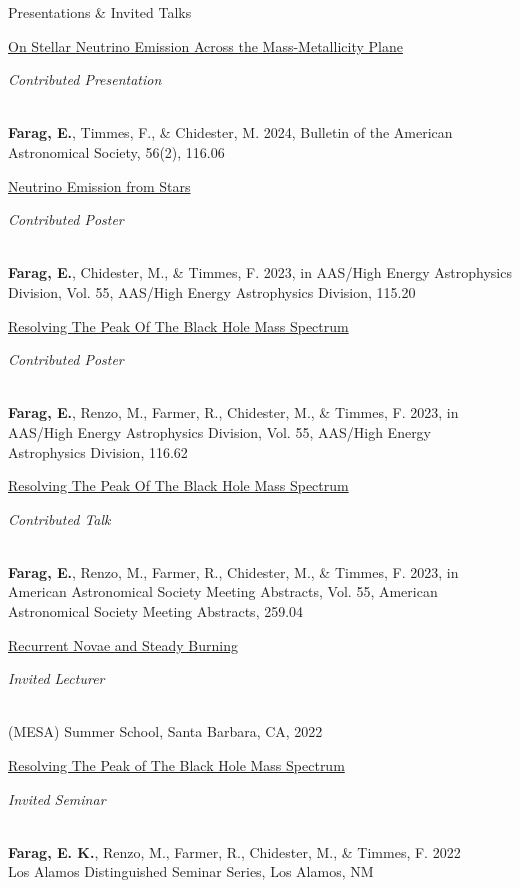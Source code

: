 \begin{rSection}{Presentations \& Invited Talks}
\begin{revnumerate}
\item \parbox[t]{0.74\linewidth}{\href{https://baas.aas.org/pub/2024n2i116p06/release/1}{On Stellar Neutrino Emission Across the Mass-Metallicity Plane}}\hfill \parbox[t]{0.24\linewidth}{\raggedleft\em Contributed Presentation}
\\ \textbf{Farag, E.}, Timmes, F., \& Chidester, M. 2024, Bulletin of the American Astronomical Society, 56(2), 116.06

\item \parbox[t]{0.74\linewidth}{\href{https://ui.adsabs.harvard.edu/abs/2023HEAD...2011520F/abstract}{Neutrino Emission from Stars}}\hfill \parbox[t]{0.24\linewidth}{\raggedleft\em Contributed Poster}
\\ \textbf{Farag, E.}, Chidester, M., \& Timmes, F. 2023, in AAS/High Energy Astrophysics Division, Vol. 55, AAS/High Energy Astrophysics Division, 115.20

\item \parbox[t]{0.74\linewidth}{\href{https://ui.adsabs.harvard.edu/abs/2023HEAD...2011662F/abstract}{Resolving The Peak Of The Black Hole Mass Spectrum}}\hfill \parbox[t]{0.24\linewidth}{\raggedleft\em Contributed Poster}
\\ \textbf{Farag, E.}, Renzo, M., Farmer, R., Chidester, M., \& Timmes, F. 2023, in AAS/High Energy Astrophysics Division, Vol. 55, AAS/High Energy Astrophysics Division, 116.62

\item \parbox[t]{0.74\linewidth}{\href{https://ui.adsabs.harvard.edu/abs/2023AAS...24125904F/abstract}{Resolving The Peak Of The Black Hole Mass Spectrum}}\hfill \parbox[t]{0.24\linewidth}{\raggedleft\em Contributed Talk}
\\ \textbf{Farag, E.}, Renzo, M., Farmer, R., Chidester, M., \& Timmes, F. 2023, in American Astronomical Society Meeting Abstracts, Vol. 55, American Astronomical Society Meeting Abstracts, 259.04

\item \parbox[t]{0.74\linewidth}{\href{https://mesastar.org/summer-school-2022/agenda/}{Recurrent Novae and Steady Burning}}\hfill \parbox[t]{0.24\linewidth}{\raggedleft\em Invited Lecturer}
\\ (MESA) Summer School, Santa Barbara, CA, 2022

\item \parbox[t]{0.74\linewidth}{\href{https://doi.org/10.2172/1876778}{Resolving The Peak of The Black Hole Mass Spectrum}}\hfill \parbox[t]{0.24\linewidth}{\raggedleft\em Invited Seminar}
\\ \textbf{Farag, E. K.}, Renzo, M., Farmer, R., Chidester, M., \& Timmes, F. 2022
\\ Los Alamos Distinguished Seminar Series, Los Alamos, NM


\end{revnumerate}
\end{rSection}
